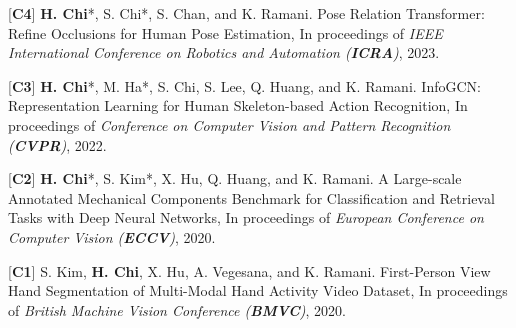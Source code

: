 \begin{cventries}
\vspace{-1em}
\cvpub
{}
{
\begin{cvitems}
    \item {[\textbf{C4}] \textbf{H. Chi}*, S. Chi*, S. Chan, and K. Ramani. Pose Relation Transformer: Refine Occlusions for Human Pose Estimation, In proceedings of \textit{IEEE International Conference on Robotics and Automation (\textbf{ICRA})}, 2023.}
    \item {[\textbf{C3}] \textbf{H. Chi}*, M. Ha*, S. Chi, S. Lee, Q. Huang, and K. Ramani. InfoGCN: Representation Learning for Human Skeleton-based Action Recognition, In proceedings of \textit{Conference on Computer Vision and Pattern Recognition (\textbf{CVPR})}, 2022.}
    \item {[\textbf{C2}] \textbf{H. Chi}*, S. Kim*, X. Hu, Q. Huang, and K. Ramani. A Large-scale Annotated Mechanical Components Benchmark for Classification and Retrieval Tasks with Deep Neural Networks, In proceedings of \textit{European Conference on Computer Vision (\textbf{ECCV})}, 2020.}
    \item {[\textbf{C1}] S. Kim, \textbf{H. Chi}, X. Hu, A. Vegesana, and K. Ramani. First-Person View Hand Segmentation of Multi-Modal Hand Activity Video Dataset, In proceedings of \textit{British Machine Vision Conference (\textbf{BMVC})}, 2020.}
\end{cvitems}
}


\end{cventries}
